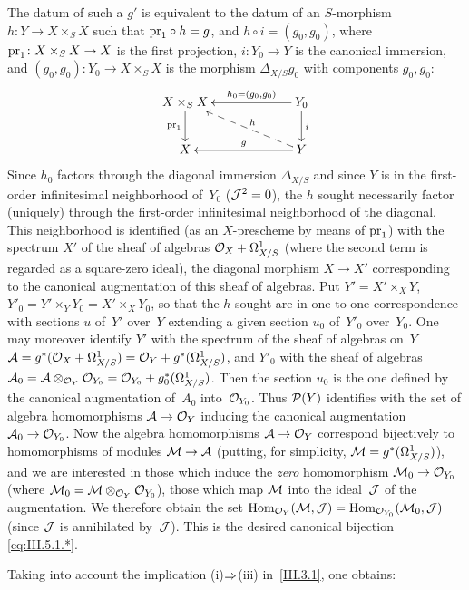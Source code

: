 The datum of such a $g'$ is equivalent to the datum of an $S$-morphism
$h\colon Y\to X\times_S X$ such that ${\pr}_1\circ h=g$, and
$h\circ i=(g_0,g_0)$, where ${\pr}_1\colon X\times_S X\to X$ is the
first projection, $i\colon Y_0\to Y$ is the canonical immersion, and
$(g_0,g_0)\colon Y_0\to X\times_S X$ is the morphism
$\Delta_{X/S}g_0$ with components $g_0,g_0$:
$$
\xymatrix@C=2.2cm{ X\times_S X \ar[d]_{{\pr}_1} & Y_0
\ar[l]_-{h_0=(g_0,g_0)} \ar[d]^i \\ X & Y \ar[l]_-g
\ar@{-->}[lu]_-h }
$$
Since $h_0$ factors through the diagonal immersion $\Delta_{X/S}$ and
since $Y$ is in the first-order infinitesimal neighborhood of~$Y_0$
(\ie $\cal{J}^2=0$), the $h$ sought necessarily factor (uniquely)
through the first-order infinitesimal neighborhood of the diagonal. This
neighborhood is identified (as an $X$-prescheme by means of ${\pr}_1$)
with the spectrum $X'$ of the sheaf of algebras
$\cal{O}_X+\Omega^1_{X/S}$ (where the second term is regarded as a
square-zero ideal), the diagonal morphism $X\to X'$ corresponding to the
canonical augmentation of this sheaf of algebras. Put
$Y'=X'\times_X Y$, $Y'_0=Y'\times_Y Y_0=X'\times_X Y_0$, so that the
$h$ sought are in one-to-one correspondence with sections $u$ of~$Y'$
over~$Y$ extending a given section $u_0$ of~$Y'_0$ over~$Y_0$. One may
moreover identify $Y'$ with the spectrum of the sheaf of algebras on~$Y$
$\cal{A}=g^*(\cal{O}_X+\Omega^1_{X/S})=\cal{O}_Y+
g^*(\Omega^1_{X/S})$, and $Y'_0$ with the sheaf of algebras
$\cal{A}_0=\cal{A}\otimes_{\cal{O}_Y}\cal{O}_{Y_0}
=\cal{O}_{Y_0}+g_0^*(\Omega^1_{X/S})$. Then the section $u_0$ is
the one defined by the canonical augmentation of~$A_0$ into~$\cal{O}_{Y_0}$.
Thus $\cal{P}(Y)$ identifies with the set of algebra homomorphisms
$\cal{A}\to\cal{O}_Y$ inducing the canonical augmentation
$\cal{A}_0\to\cal{O}_{Y_0}$. Now the algebra homomorphisms
$\cal{A}\to\cal{O}_Y$ correspond bijectively to homomorphisms of
modules $\cal{M}\to\cal{A}$ (putting, for simplicity,
$\cal{M}=g^*(\Omega^1_{X/S})$), and we are interested in those which
induce the {\emph{zero}} homomorphism $\cal{M}_0\to\cal{O}_{Y_0}$ (where
$\cal{M}_0=\cal{M}\otimes_{\cal{O}_Y}\cal{O}_{Y_0}$), \ie those which
map $\cal{M}$ into the ideal~$\cal{J}$ of the augmentation. We therefore
obtain the set
$\Hom_{\cal{O}_Y}(\cal{M},\cal{J})=\Hom_{\cal{O}_{Y_0}}(\cal{M}_0,\cal{J})$
(since $\cal{J}$ is annihilated by~$\cal{J}$). This is the desired
canonical bijection \eqref{eq:III.5.1.*}.

Taking into account the implication (i)$\To$(iii) in~\ref{III.3.1}, one
obtains:

